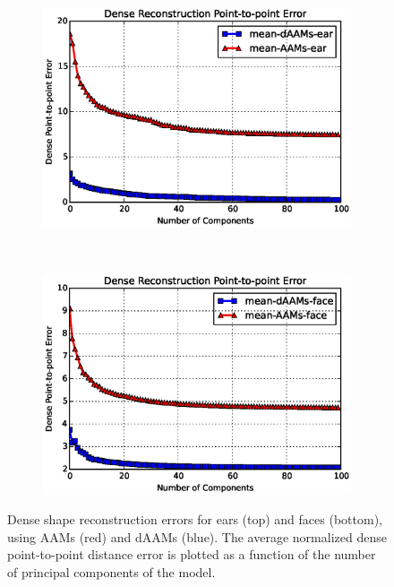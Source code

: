 \begin{figure}[!t]
    \centering
    \begin{subfigure}[b]{\columnwidth}
            \includegraphics[width=\textwidth,trim={0 0 0 25pt},clip]{Suplementory_Meterial/Model_Analysis/sr_ear}
    \end{subfigure}
    \\
    \begin{subfigure}[b]{\columnwidth}
            \includegraphics[width=\textwidth,trim={0 0 0 25pt},clip]{Suplementory_Meterial/Model_Analysis/sr_face}
    \end{subfigure}
    \caption{Dense shape reconstruction errors for ears (top) and faces (bottom), using AAMs (red) and dAAMs (blue). The average normalized dense point-to-point distance error is plotted as a function of the number of principal components of the model.}
    \label{fig:rc_face}
\end{figure}

